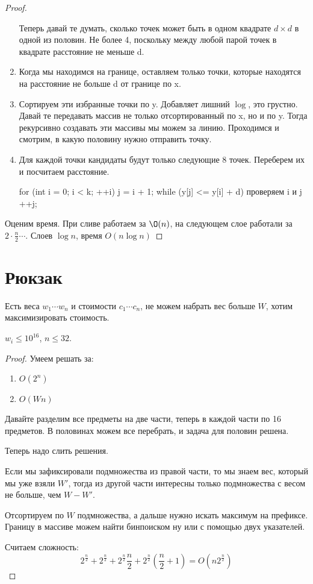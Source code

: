 \begin{proof}
\begin{enumerate}
       Теперь давай те думать, сколько точек может быть в одном квадрате $d \times d$ в одной из половин. Не более 4, поскольку между
       любой парой точек в квадрате расстояние не меньше d.
       \item
       Когда мы находимся на границе, оставляем только точки, которые находятся на расстояние не больше d от границе  по x.
       \item
       Сортируем эти избранные точки по y. Добавляет лишний $\log$, это грустно. Давай те передавать массив не только
       отсортированный по x, но и по y. Тогда рекурсивно создавать эти массивы мы можем за линию. Проходимся и смотрим, в какую половину нужно
       отправить точку. 
       \item
       Для каждой точки кандидаты будут только следующие 8 точек. Переберем их и посчитаем расстояние.  
       \begin{cppcode}
       for (int i = 0; i < k; ++i) {
           j = i + 1;
           while (y[j] <= y[i] + d) {
               проверяем i и j
               ++j;
           }
       }
       \end{cppcode}
       \end{enumerate}
        Оценим время. При сливе работаем за $\O(n)$, на следующем слое работали за $2 \cdot \frac{n}{2} \cdots$. 
        Слоев $\log n$, время $O(n \log n)$

    \end{proof}
\section{Рюкзак}
 Есть веса $w_1 \cdots w_n$ и стоимости $c_1 \cdots c_n$, не можем набрать вес больше $W$, хотим 
максимизировать стоимость. 

$w_i \le 10^{16}$, $n \le 32$.
\begin{proof}
Умеем решать за:
   \begin{enumerate}
   \item $O(2^n)$
   \item $O(Wn)$
   \end{enumerate}

Давайте разделим все предметы на две части, теперь в каждой части по 16 предметов. В половинах можем все перебрать, и задача для половин решена.

Теперь надо слить решения.

Если мы зафиксировали подмножества из правой части, то мы знаем вес, который мы уже взяли $W'$, тогда из другой части интересны только
подмножества с весом не больше, чем $W - W'$.

Отсортируем по $W$ подмножества, а дальше нужно искать максимум на префиксе. Границу в массиве можем найти бинпоиском ну или с помощью двух указателей.

Считаем сложность: 
$$2^{\frac{n}{2}} + 2^{\frac{n}{2}} + 2^{\frac{n}{2}} \frac{n}{2} + 2^{\frac{n}{2}}(\frac{n}{2} + 1) = O(n 2^\frac{n}{2})$$   
\end{proof}
